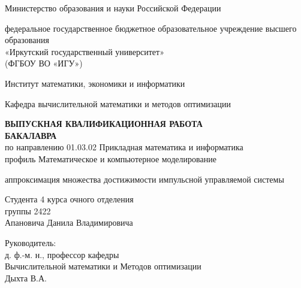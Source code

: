 \begin{titlepage}
  \newpage
  \begin{singlespacing}
    \begin{center}
      
      Министерство образования и науки Российской Федерации

      федеральное государственное бюджетное образовательное учреждение
      высшего образования \\
      «Иркутский государственный университет» \\
      (ФГБОУ ВО «ИГУ»)

      Институт математики, экономики и информатики

      Кафедра вычислительной математики и методов оптимизации

      \vspace{6em}
      { \bf ВЫПУСКНАЯ КВАЛИФИКАЦИОННАЯ РАБОТА\\БАКАЛАВРА }
      \\[0.3cm]
      по направлению 01.03.02 Прикладная математика и информатика \\
      профиль Математическое и компьютерное моделирование
      
      \vspace{1em}

      {  аппроксимация множества достижимости импульсной
        управляемой системы }
    \end{center}      
    \vspace{1.5em}

    \begin{flushright}
      \parindent=0pt
      Студента 4 курса очного отделения\\
      группы 2422\\
      Апановича Данила Владимировича

      \vspace{1em}

      Руководитель:\\
      д. ф.-м. н., профессор кафедры\\ Вычислительной математики и Методов оптимизации \\ 
      \underline{\phantom{Четкая подпись}} Дыхта В.А. 


\end{flushright}
\end{singlespacing}
\end{titlepage}
